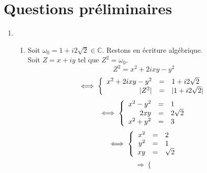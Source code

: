 \section{Questions préliminaires}
\begin{enumerate}
    \item \begin{enumerate}
              \item  Soit $\omega_0 = 1 + i 2\sqrt{2} \in \mathbb{C}$.
                    Restons en écriture algébrique.\\
                    Soit $Z = x + iy$ tel que $Z^{2}=\omega_0$.
                    \[
                        Z^{2} = x^{2} + 2ixy - y^{2}
                    \]
                    \[
                        \iff
                        \left\{
                        \begin{array}{r c l}
                            x^{2} + 2ixy - y^{2} & = & 1 + i 2\sqrt{2}               \\
                            \lvert Z^{2} \rvert  & = & \lvert 1 + i 2\sqrt{2} \rvert \\
                        \end{array}
                        \right.\newline
                    \]
                    \[
                        \iff
                        \left\{
                        \begin{array}{r c l}
                            x^{2} - y^{2} & = & 1         \\
                            2xy           & = & 2\sqrt{2} \\
                            x^{2} + y^{2} & = & 3         \\
                        \end{array}
                        \right.
                    \]
                    \[
                        \iff
                        \left\{
                        \begin{array}{r c l}
                            x^{2} & = & 2        \\
                            y^{2} & = & 1        \\
                            xy    & = & \sqrt{2} \\
                        \end{array}
                        \right.
                    \]
                    \[
                        \Rightarrow
                        \left\{
\]
\end{enumerate}
\end{enumerate}
